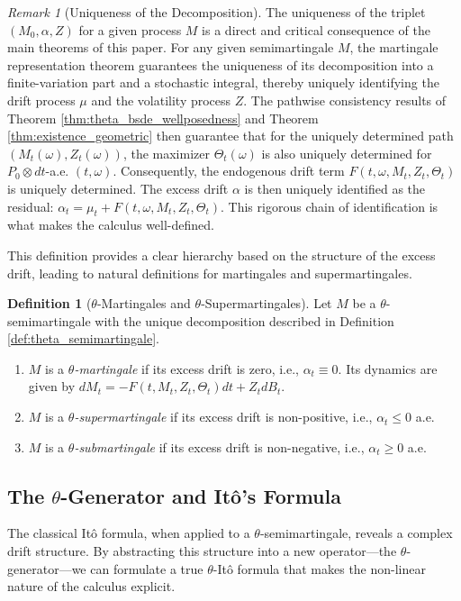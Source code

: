 \documentclass[12pt, letterpaper]{amsart}
\theoremstyle{plain}
\theoremstyle{definition}
\newtheorem{definition}[theorem]{Definition}
\theoremstyle{remark}
\newtheorem{remark}[theorem]{Remark}
\numberwithin{equation}{section} %
\begin{document}
\begin{remark}[Uniqueness of the Decomposition]
The uniqueness of the triplet \((M_0, \alpha, Z)\) for a given process \(M\) is a direct and critical consequence of the main theorems of this paper. For any given semimartingale \(M\), the martingale representation theorem guarantees the uniqueness of its decomposition into a finite-variation part and a stochastic integral, thereby uniquely identifying the drift process \(\mu\) and the volatility process \(Z\). The pathwise consistency results of Theorem \ref{thm:theta_bsde_wellposedness} and Theorem \ref{thm:existence_geometric} then guarantee that for the uniquely determined path \((M_t(\omega), Z_t(\omega))\), the maximizer \(\Theta_t(\omega)\) is also uniquely determined for \(P_0 \otimes dt\)-a.e. \((t,\omega)\). Consequently, the endogenous drift term \(F(t, \omega, M_t, Z_t, \Theta_t)\) is uniquely determined. The excess drift \(\alpha\) is then uniquely identified as the residual: \(\alpha_t = \mu_t + F(t,\omega,M_t,Z_t,\Theta_t)\). This rigorous chain of identification is what makes the calculus well-defined.
\end{remark}

This definition provides a clear hierarchy based on the structure of the excess drift, leading to natural definitions for martingales and supermartingales.

\begin{definition}[$\theta$-Martingales and $\theta$-Supermartingales]
Let \(M\) be a \(\theta\)-semimartingale with the unique decomposition described in Definition \ref{def:theta_semimartingale}.
\begin{enumerate}
    \item \(M\) is a \emph{\(\theta\)-martingale} if its excess drift is zero, i.e., \(\alpha_t \equiv 0\). Its dynamics are given by \(dM_t = -F(t,M_t,Z_t,\Theta_t)dt + Z_t dB_t\).
    \item \(M\) is a \emph{\(\theta\)-supermartingale} if its excess drift is non-positive, i.e., \(\alpha_t \le 0\) a.e.
    \item \(M\) is a \emph{\(\theta\)-submartingale} if its excess drift is non-negative, i.e., \(\alpha_t \ge 0\) a.e.
\end{enumerate}
\end{definition}

\subsection{The \texorpdfstring{$\theta$}{theta}-Generator and Itô's Formula}
The classical Itô formula, when applied to a \(\theta\)-semimartingale, reveals a complex drift structure. By abstracting this structure into a new operator—the \(\theta\)-generator—we can formulate a true \(\theta\)-Itô formula that makes the non-linear nature of the calculus explicit.
\end{document}
